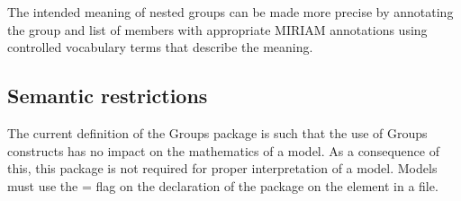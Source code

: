 The intended meaning of nested groups can be made more precise by annotating the group and list of members with appropriate MIRIAM annotations using controlled vocabulary terms that describe the meaning.


\subsection{Semantic restrictions}
\label{semantic-restrictions}

The current definition of the Groups package is such that the use of Groups constructs has no impact on the mathematics of a model.  As a consequence of this, this package is not required for proper interpretation of a model. Models must use the = flag on the declaration of the package on the  element in a file.

